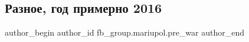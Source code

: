  
 
 
 
 

\subsection{Разное, год примерно 2016}
\label{sec:17_02_2023.fb.fb_group.mariupol.pre_war.2.raznoe__god_primerno}

\ifcmt
 author_begin
   author_id fb_group.mariupol.pre_war
 author_end
\fi
